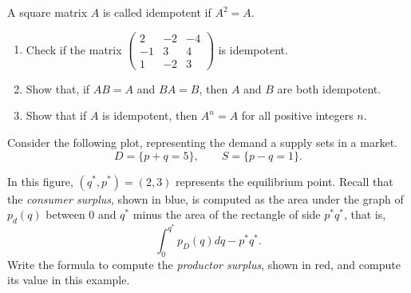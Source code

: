 \documentclass[11.0pt]{exam}
\begin{document}
\begin{questions}

\question[3]
    A square matrix $A$ is called idempotent if $A^2 = A$.
    \begin{enumerate}[leftmargin = 0.5cm, label = (\alph*), rightmargin = 0.2cm]
        \item Check if the matrix 
        $\begin{pmatrix}
        2  & -2 & -4 \\
        -1 & 3  & 4 \\
        1  & -2 & 3
        \end{pmatrix}$ is idempotent.
        \item Show that, if $AB = A$ and $BA = B$, then $A$ and $B$ are both idempotent.
        \item Show that if $A$ is idempotent, then $A^n = A$ for all positive integers $n$.
    \end{enumerate}

\question[3] Consider the following plot, representing the demand a supply sets in a market.
\[D=\{p+q=5\},\qquad S=\{p-q=1\}.\]

\begin{center}
\end{center}

    In this figure, $(q^*,p^*)=(2,3)$ represents the equilibrium point. Recall that the \emph{consumer surplus}, shown in blue, is computed as the area under the graph of $p_d(q)$ between $0$ and $q^*$ minus the area of the rectangle of side $p^*q^*$, that is, \[\int_0^{q^*}p_D(q) dq-p^*q^*.\] Write the formula to compute the \emph{productor surplus}, shown in red, and compute its value in this example.


\end{questions}
\end{document}
